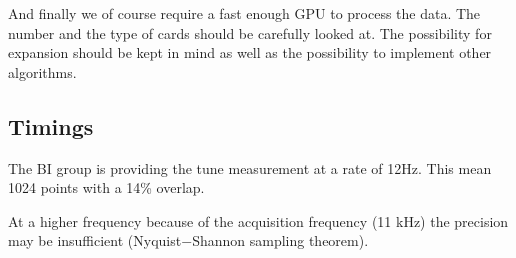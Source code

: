And finally we of course require a fast enough GPU to process the data. The number and the type of cards should be carefully looked at. The possibility for expansion should be kept in mind as well as the possibility to implement other algorithms.

\subsection{Timings}

The \gls{BI} group is providing the tune measurement at a rate of 12Hz. This mean 1024 points with a 14\% overlap. 

At a higher frequency because of the acquisition frequency (11 kHz) the precision may be insufficient (Nyquist$-$Shannon sampling theorem).